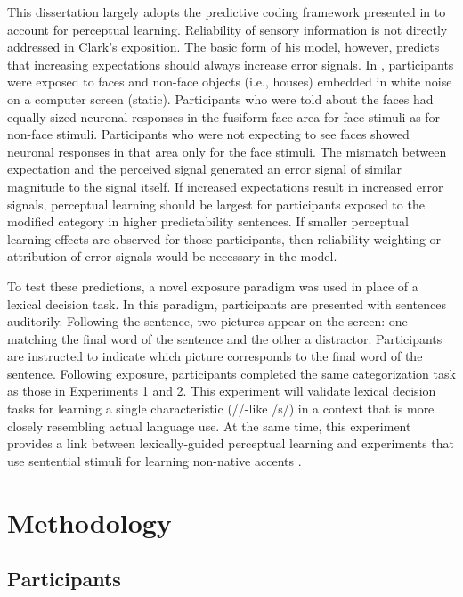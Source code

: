 This dissertation largely adopts the predictive coding framework presented in \citet{Clark2013} to account for perceptual learning.
Reliability of sensory information is not directly addressed in Clark's exposition.
The basic form of his model, however, predicts that increasing expectations should always increase error signals.
In \citet[cited in \citet{Clark2013}]{Egner2010}, participants were exposed to faces and non-face objects (i.e., houses) embedded in white noise on a computer screen (static).
Participants who were told about the faces had equally-sized neuronal responses in the fusiform face area for face stimuli as for non-face stimuli.  
Participants who were not expecting to see faces showed neuronal responses in that area only for the face stimuli.
The mismatch between expectation and the perceived signal generated an error signal of similar magnitude to the signal itself.
If increased expectations result in increased error signals, perceptual learning should be largest for participants exposed to the modified category in higher predictability sentences.
If smaller perceptual learning effects are observed for those participants, then reliability weighting or attribution of error signals would be necessary in the model.

To test these predictions, a novel exposure paradigm was used in place of a lexical decision task.  
In this paradigm, participants are presented with sentences auditorily.  
Following the sentence, two pictures appear on the screen: one matching the final word of the sentence and the other a distractor. 
Participants are instructed to indicate which picture corresponds to the final word of the sentence.
Following exposure, participants completed the same categorization task as those in Experiments 1 and 2.
This experiment will validate lexical decision tasks for learning a single characteristic (/\textesh/-like /s/) in a context that is more closely resembling actual language use.
At the same time, this experiment provides a link between lexically-guided perceptual learning and experiments that use sentential stimuli for learning non-native accents \citep{Bradlow2008}.

\section{Methodology}

\subsection{Participants}

